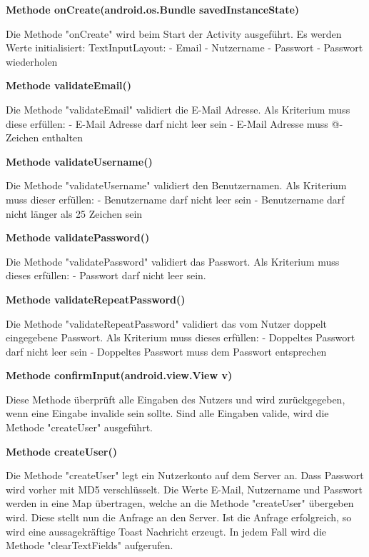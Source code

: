 \documentclass{scrartcl}
\begin{document}
\noindent\textbf{Methode onCreate(android.os.Bundle savedInstanceState)}

\noindent Die Methode "onCreate" wird beim Start der Activity ausgeführt. Es werden Werte initialisiert: TextInputLayout: - Email - Nutzername - Passwort - Passwort wiederholen \newline 

\noindent\textbf{Methode validateEmail()}
 
\noindent Die Methode "validateEmail" validiert die E-Mail Adresse. Als Kriterium muss diese erfüllen: - E-Mail Adresse darf nicht leer sein - E-Mail Adresse muss @-Zeichen enthalten \newline 

\noindent\textbf{Methode validateUsername()}
 
\noindent Die Methode "validateUsername" validiert den Benutzernamen. Als Kriterium muss dieser erfüllen: - Benutzername darf nicht leer sein - Benutzername darf nicht länger als 25 Zeichen sein \newline 

\noindent\textbf{Methode validatePassword()}
 
\noindent Die Methode "validatePassword" validiert das Passwort. Als Kriterium muss dieses erfüllen: - Passwort darf nicht leer sein. \newline

\noindent\textbf{Methode validateRepeatPassword()}
 
\noindent Die Methode "validateRepeatPassword" validiert das vom Nutzer doppelt eingegebene Passwort. Als Kriterium muss dieses erfüllen: - Doppeltes Passwort darf nicht leer sein - Doppeltes Passwort muss dem Passwort entsprechen \newline 

\noindent\textbf{Methode confirmInput(android.view.View v)}
 
\noindent Diese Methode überprüft alle Eingaben des Nutzers und wird zurückgegeben, wenn eine Eingabe invalide sein sollte. Sind alle Eingaben valide, wird die Methode "createUser" ausgeführt. \newline 

\noindent\textbf{Methode createUser()}
 
\noindent Die Methode "createUser" legt ein Nutzerkonto auf dem Server an. Dass Passwort wird vorher mit MD5 verschlüsselt. Die Werte E-Mail, Nutzername und Passwort werden in eine Map übertragen, welche an die Methode "createUser" übergeben wird. Diese stellt nun die Anfrage an den Server. Ist die Anfrage erfolgreich, so wird eine aussagekräftige Toast Nachricht erzeugt. In jedem Fall wird die Methode "clearTextFields" aufgerufen. \newline 
\end{document}
